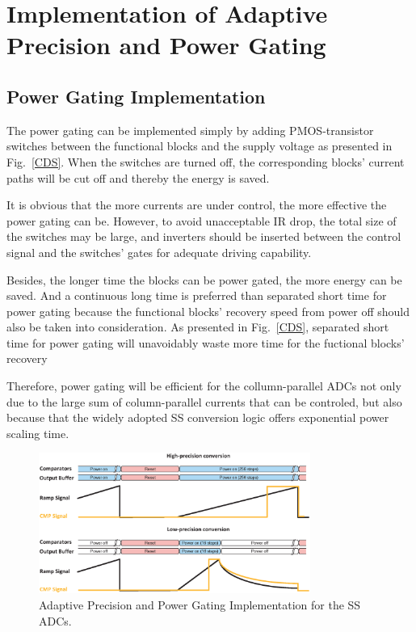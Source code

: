 \section{Implementation of Adaptive Precision and Power Gating}\label{strategy}

\subsection{Power Gating Implementation}

The power gating can be implemented simply by adding PMOS-transistor switches between the functional blocks and the supply voltage \cite{keating_low_2007} as presented in Fig.~\ref{CDS}. 
When the switches are turned off, the corresponding blocks’ current paths will be cut off and thereby the energy is saved. 

It is obvious that the more currents are under control, the more effective the power gating can be. However, to avoid unacceptable IR drop, the total size of the switches may be large, 
and inverters should be inserted between the control signal and the switches’ gates for adequate driving capability. 

Besides, the longer time the blocks can be power gated, the more energy can be saved. And a continuous long time is preferred than separated short time for power gating because
the functional blocks’ recovery speed from power off should also be taken into consideration.
As presented in Fig.~\ref{CDS}, separated short time for power gating will unavoidably waste more
time for the fuctional blocks' recovery 

Therefore, power gating will be efficient for the collumn-parallel ADCs not only due to the large sum of column-parallel currents that can be controled,
but also because that the widely adopted SS conversion logic offers exponential power scaling time.

\begin{figure}[htbp]
	\centerline{\includegraphics[width=3.5in]{./Figures/SS_pg.eps}}
	\caption{Adaptive Precision and Power Gating Implementation for the SS ADCs.}
	\label{SS_pg}
\end{figure} 

